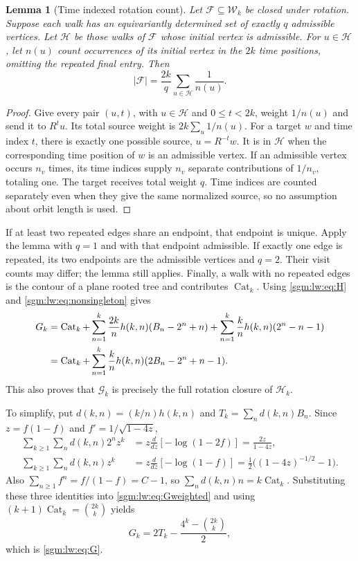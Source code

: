 \documentclass[11pt,letterpaper]{article}
\newtheorem{lemma}[theorem]{Lemma}\newtheorem{proposition}[theorem]{Proposition}\newtheorem{corollary}[theorem]{Corollary}
\theoremstyle{remark}\newtheorem{remark}[theorem]{Remark}
\newcommand{\Wc}{\mathcal W}\newcommand{\Uc}{\mathcal U}\newcommand{\Part}{\operatorname{Part}}
\newcommand{\Cat}{\operatorname{Cat}}\newcommand{\E}{\mathbb E}\newcommand{\Prob}{\mathbb P}\newcommand{\ind}{\mathbf 1}
\newcommand{\Gc}{\mathcal G}\newcommand{\Hc}{\mathcal H}\newcommand{\Jc}{\mathcal J}
\theoremstyle{definition}\newtheorem{definition}[theorem]{Definition}
\begin{document}
\begin{lemma}[Time indexed rotation count]\label{sgm:lw:lem:rotation}
Let $\mathcal F\subseteq\Wc_k$ be closed under rotation. Suppose each walk has an equivariantly determined set of exactly $q$ admissible vertices. Let $\mathcal H$ be those walks of $\mathcal F$ whose initial vertex is admissible. For $u\in\mathcal H$, let $n(u)$ count occurrences of its initial vertex in the $2k$ time positions, omitting the repeated final entry. Then
\begin{equation}\label{sgm:lw:eq:rotation}
 |\mathcal F|=\frac{2k}{q}\sum_{u\in\mathcal H}\frac1{n(u)}.
\end{equation}
\end{lemma}
\begin{proof}
Give every pair $(u,t)$, with $u\in\mathcal H$ and $0\le t<2k$, weight $1/n(u)$ and send it to $R^tu$. Its total source weight is $2k\sum_u1/n(u)$. For a target $w$ and time index $t$, there is exactly one possible source, $u=R^{-t}w$. It is in $\mathcal H$ when the corresponding time position of $w$ is an admissible vertex. If an admissible vertex occurs $n_v$ times, its time indices supply $n_v$ separate contributions of $1/n_v$, totaling one. The target receives total weight $q$. Time indices are counted separately even when they give the same normalized source, so no assumption about orbit length is used.
\end{proof}

If at least two repeated edges share an endpoint, that endpoint is unique. Apply the lemma with $q=1$ and with that endpoint admissible. If exactly one edge is repeated, its two endpoints are the admissible vertices and $q=2$. Their visit counts may differ; the lemma still applies. Finally, a walk with no repeated edges is the contour of a plane rooted tree and contributes $\Cat_k$. Using \eqref{sgm:lw:eq:H} and \eqref{sgm:lw:eq:nonsingleton} gives
\begin{align}
 G_k&=\Cat_k+\sum_{n=1}^k\frac{2k}{n}h(k,n)(B_n-2^n+n)
              +\sum_{n=1}^k\frac{k}{n}h(k,n)(2^n-n-1)\notag\\
 &=\Cat_k+\sum_{n=1}^k\frac{k}{n}h(k,n)(2B_n-2^n+n-1).\label{sgm:lw:eq:Gweighted}
\end{align}
This also proves that $\Gc_k$ is precisely the full rotation closure of $\Hc_k$.

To simplify, put $d(k,n)=(k/n)h(k,n)$ and $T_k=\sum_nd(k,n)B_n$. Since $z=f(1-f)$ and $f'=1/\sqrt{1-4z}$,
\begin{align*}
 \sum_{k\ge1}\sum_nd(k,n)2^n z^k
 &=z\frac{d}{dz}[-\log(1-2f)]=\frac{2z}{1-4z},\\
 \sum_{k\ge1}\sum_nd(k,n)z^k
 &=z\frac{d}{dz}[-\log(1-f)]
   =\frac12\bigl((1-4z)^{-1/2}-1\bigr).
\end{align*}
Also $\sum_{n\ge1}f^n=f/(1-f)=C-1$, so
$\sum_n d(k,n)n=k\Cat_k$. Substituting these three identities into \eqref{sgm:lw:eq:Gweighted} and using $(k+1)\Cat_k=\binom{2k}{k}$ yields
\begin{equation}\label{sgm:lw:eq:GT}
 G_k=2T_k-\frac{4^k-\binom{2k}{k}}2,
\end{equation}
which is \eqref{sgm:lw:eq:G}.
\end{document}
